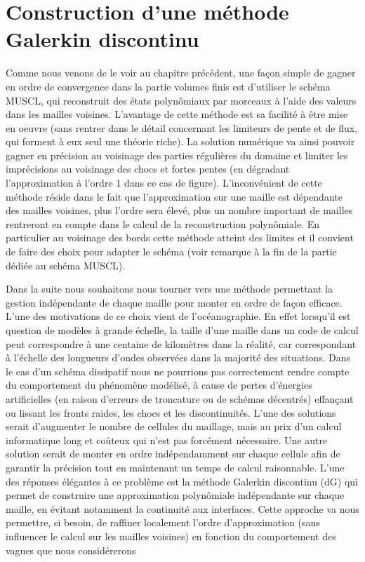 \chapter{Construction d'une méthode Galerkin discontinu}

Comme nous venons de le voir au chapitre précédent, une façon simple de gagner en ordre de convergence dans la partie volumes finis est d'utiliser le schéma MUSCL, qui reconstruit des états polynômiaux par morceaux à l'aide des valeurs dans les mailles voisines. L'avantage de cette méthode est sa facilité à être mise en oeuvre (sans rentrer dans le détail concernant les limiteurs de pente et de flux, qui forment à eux seul une théorie riche). La solution numérique va ainsi pouvoir gagner en précision au voisinage des parties régulières du domaine et limiter les imprécisions au voisinage des  chocs et fortes pentes (en dégradant l'approximation à l'ordre 1 dans ce cas de figure).
L'inconvénient de cette méthode réside dans le fait que l'approximation sur une maille est dépendante des mailles voisines, plus l'ordre sera élevé, plus un nombre important de mailles rentreront en compte dans le calcul de la reconstruction polynômiale. En particulier au voisinage des bords cette méthode atteint des limites et il convient de faire des choix pour adapter le schéma (voir remarque à la fin de la partie dédiée au schéma MUSCL).

Dans la suite nous souhaitons nous tourner vers une méthode permettant la gestion indépendante de chaque maille pour monter en ordre de façon efficace. 
L'une des motivations de ce choix vient de l'océanographie. En effet lorsqu'il est question de modèles à grande échelle, la taille d'une maille dans un code de calcul peut correspondre à une centaine de kilomètres dans la réalité, car correspondant à l'échelle des longueurs d'ondes observées dans la majorité des situations. Dans le cas d'un schéma dissipatif nous ne pourrions pas correctement rendre compte du comportement du phénomène modélisé, à cause de pertes d'énergies artificielles (en raison d'erreurs de troncature ou de schémas décentrés) effançant ou lissant les fronts raides, les chocs et les discontinuités. L'une des solutions serait d'augmenter le nombre de cellules du maillage, mais au prix d'un calcul informatique long et coûteux qui n'est pas forcément nécessaire. Une autre solution serait de monter en ordre indépendamment sur chaque cellule afin de garantir la précision tout en maintenant un temps de calcul raisonnable. L'une des réponses élégantes à ce problème est la méthode Galerkin discontinu (dG) qui permet de construire une approximation polynômiale indépendante sur chaque maille, en évitant notamment la continuité aux interfaces. Cette approche va nous permettre, si besoin, de raffiner localement l'ordre d'approximation (sans influencer le calcul sur les mailles voisines) en fonction du comportement des vagues que nous considérerons

